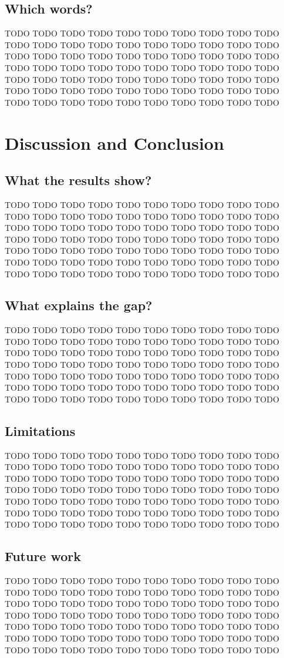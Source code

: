 \documentclass[runningheads,a4paper,oribibl]{llncs}
\begin{document}
\subsection{Which words?}\label{sec:words}
TODO TODO TODO TODO TODO TODO TODO TODO TODO TODO TODO TODO TODO TODO TODO TODO TODO TODO TODO TODO TODO TODO TODO TODO TODO TODO TODO TODO TODO TODO TODO TODO TODO TODO TODO TODO TODO TODO TODO TODO TODO TODO TODO TODO TODO TODO TODO TODO TODO TODO TODO TODO TODO TODO TODO TODO TODO TODO TODO TODO TODO TODO TODO TODO TODO TODO TODO TODO TODO TODO

\section{Discussion and Conclusion}\label{sec:discussion}
\subsection{What the results show?}
TODO TODO TODO TODO TODO TODO TODO TODO TODO TODO TODO TODO TODO TODO TODO TODO TODO TODO TODO TODO TODO TODO TODO TODO TODO TODO TODO TODO TODO TODO TODO TODO TODO TODO TODO TODO TODO TODO TODO TODO TODO TODO TODO TODO TODO TODO TODO TODO TODO TODO TODO TODO TODO TODO TODO TODO TODO TODO TODO TODO TODO TODO TODO TODO TODO TODO TODO TODO TODO TODO

\subsection{What explains the gap?}
TODO TODO TODO TODO TODO TODO TODO TODO TODO TODO TODO TODO TODO TODO TODO TODO TODO TODO TODO TODO TODO TODO TODO TODO TODO TODO TODO TODO TODO TODO TODO TODO TODO TODO TODO TODO TODO TODO TODO TODO TODO TODO TODO TODO TODO TODO TODO TODO TODO TODO TODO TODO TODO TODO TODO TODO TODO TODO TODO TODO TODO TODO TODO TODO TODO TODO TODO TODO TODO TODO

\subsection{Limitations}
TODO TODO TODO TODO TODO TODO TODO TODO TODO TODO TODO TODO TODO TODO TODO TODO TODO TODO TODO TODO TODO TODO TODO TODO TODO TODO TODO TODO TODO TODO TODO TODO TODO TODO TODO TODO TODO TODO TODO TODO TODO TODO TODO TODO TODO TODO TODO TODO TODO TODO TODO TODO TODO TODO TODO TODO TODO TODO TODO TODO TODO TODO TODO TODO TODO TODO TODO TODO TODO TODO

\subsection{Future work}\label{sec:future}
TODO TODO TODO TODO TODO TODO TODO TODO TODO TODO TODO TODO TODO TODO TODO TODO TODO TODO TODO TODO TODO TODO TODO TODO TODO TODO TODO TODO TODO TODO TODO TODO TODO TODO TODO TODO TODO TODO TODO TODO TODO TODO TODO TODO TODO TODO TODO TODO TODO TODO TODO TODO TODO TODO TODO TODO TODO TODO TODO TODO TODO TODO TODO TODO TODO TODO TODO TODO TODO TODO
\end{document}
